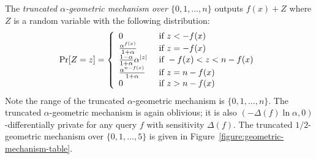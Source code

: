 The \emph{truncated $\alpha$-geometric mechanism over $\{ 0, 1,
  \ldots, n \}$}
outputs $f (x) + Z$ where $Z$ is a random variable with the following
distribution:
\[
\Pr[Z = z] =
\left\{
  \begin{array}{ll}
    0 & \textmd{ if } z < - f (x) \\
    \frac{\alpha^{f (x)}}{1 + \alpha} & \textmd{ if } z = -f (x)\\
    \frac{1 - \alpha}{1 + \alpha}\alpha^{|z|} &
    \textmd{ if } -f (x) < z < n - f (x)\\
    \frac{\alpha^{n - f (x)}}{1 + \alpha} & \textmd{ if } z = n-f (x)\\
    0 & \textmd{ if } z > n - f (x)
  \end{array}
\right.
\]
Note the range of the truncated $\alpha$-geometric mechanism is
$\{ 0, 1, \ldots, n \}$. The truncated $\alpha$-geometric mechanism is
again oblivious; it is also $(- {\Delta (f)} \ln \alpha, 0)$-differentially
private for any query $f$ with sensitivity $\Delta (f)$.
The truncated $1/2$-geometric mechanism over $\{ 0, 1, \ldots, 5 \}$ is
given in Figure~\ref{figure:geometric-mechanism-table}.

